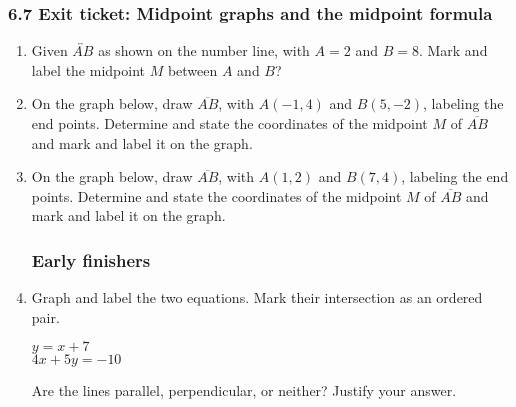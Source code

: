 \documentclass[12pt, twoside]{article}
\begin{document}
\subsubsection*{6.7 Exit ticket: Midpoint graphs and the midpoint formula}
  \begin{enumerate}

  \item Given $\overleftrightarrow{AB}$ as shown on the number line, with $A=2$ and $B=8$. Mark and label the midpoint $M$ between $A$ and $B$?\\[20pt] %
  
  \item On the graph below, draw $\overline{AB}$, with $A(-1,4)$ and $B(5,-2)$, labeling the end points. Determine and state the coordinates of the midpoint $M$ of $\overline{AB}$ and mark and label it on the graph.
  \begin{flushright}
  \end{flushright}
  
  
  \item On the graph below, draw $\overline{AB}$, with $A(1,2)$ and $B(7,4)$, labeling the end points. Determine and state the coordinates of the midpoint $M$ of $\overline{AB}$ and mark and label it on the graph.
  \begin{flushright}
  \end{flushright}
  \vspace{1cm}

\newpage
\subsubsection*{Early finishers}
\item Graph and label the two equations. Mark their intersection as an ordered pair.
\begin{multicols}{2}
  $y = x+7$ \\
  $4x+5y=-10$
\end{multicols}     \vspace{2cm}
Are the lines parallel, perpendicular, or neither? Justify your answer.
\vspace{2cm}


\end{enumerate}
\end{document}
